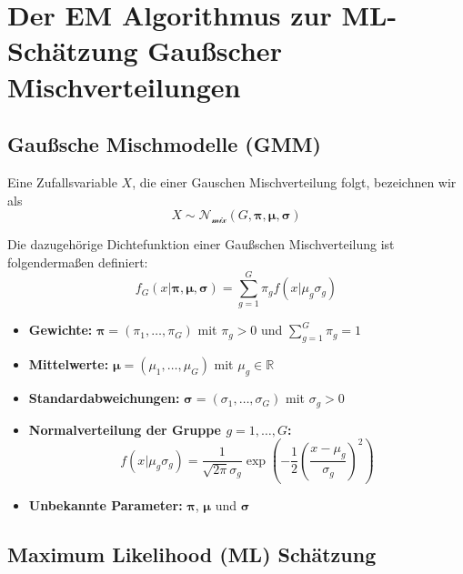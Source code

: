 \documentclass[
  ngerman,
]{book}
\providecommand{\tightlist}{%
  \setlength{\itemsep}{0pt}\setlength{\parskip}{0pt}}
\begin{document}
\hypertarget{der-em-algorithmus-zur-ml-schuxe4tzung-gauuxdfscher-mischverteilungen}{%
\section{Der EM Algorithmus zur ML-Schätzung Gaußscher Mischverteilungen}\label{der-em-algorithmus-zur-ml-schuxe4tzung-gauuxdfscher-mischverteilungen}}

\hypertarget{gauuxdfsche-mischmodelle-gmm}{%
\subsection{Gaußsche Mischmodelle (GMM)}\label{gauuxdfsche-mischmodelle-gmm}}

Eine Zufallsvariable \(X\), die einer Gauschen Mischverteilung folgt, bezeichnen wir als
\[
X\sim\mathcal{N}_{\mathcal{mix}}(G,\boldsymbol{\pi},\boldsymbol{\mu},\boldsymbol{\sigma})
\]

Die dazugehörige Dichtefunktion einer Gaußschen Mischverteilung ist folgendermaßen definiert:
\begin{equation}
f_G(x|\boldsymbol{\pi},\boldsymbol{\mu},\boldsymbol{\sigma})=\sum_{g=1}^G\pi_gf(x|\mu_g\sigma_g) \label{eq:GMMdens}
\end{equation}

\begin{itemize}
\tightlist
\item
  \textbf{Gewichte:} \(\boldsymbol{\pi}=(\pi_1,\dots,\pi_G)\) mit \(\pi_g>0\) und \(\sum_{g=1}^G\pi_g=1\)
\item
  \textbf{Mittelwerte:} \(\boldsymbol{\mu}=(\mu_1,\dots,\mu_G)\) mit \(\mu_g\in\mathbb{R}\)
\item
  \textbf{Standardabweichungen:} \(\boldsymbol{\sigma}=(\sigma_1,\dots,\sigma_G)\) mit \(\sigma_g>0\)
\item
  \textbf{Normalverteilung der Gruppe \(g=1,\dots,G\):}
  \[
  f(x|\mu_g\sigma_g)=\frac{1}{\sqrt{2\pi}\sigma_g}\exp\left(-\frac{1}{2}\left(\frac{x-\mu_g}{\sigma_g}\right)^2\right)
  \]
\item
  \textbf{Unbekannte Parameter:} {\(\boldsymbol{\pi}\)}, {\(\boldsymbol{\mu}\)} und {\(\boldsymbol{\sigma}\)}
\end{itemize}

\hypertarget{maximum-likelihood-ml-schuxe4tzung}{%
\subsection{Maximum Likelihood (ML) Schätzung}\label{maximum-likelihood-ml-schuxe4tzung}}
\end{document}
